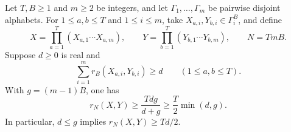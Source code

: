 \begin{lemma}\label{lem:tagged}
Let $T,B\geq1$ and $m\geq2$ be integers, and let
$\Gamma_1,\ldots,\Gamma_m$ be pairwise disjoint alphabets. For
$1\leq a,b\leq T$ and $1\leq i\leq m$, take
$X_{a,i},Y_{b,i}\in\Gamma_i^B$, and define
\[
 X=\prod_{a=1}^T(X_{a,1}\cdots X_{a,m}),\qquad
 Y=\prod_{b=1}^T(Y_{b,1}\cdots Y_{b,m}),\qquad N=TmB.
\]
Suppose $d\geq0$ is real and
\begin{equation}\label{eq:local-tagged}
 \sum_{i=1}^m r_B(X_{a,i},Y_{b,i})\geq d
 \qquad(1\leq a,b\leq T).
\end{equation}
With $g=(m-1)B$, one has
\begin{equation}\label{eq:tagged-result}
 r_N(X,Y)\geq\frac{Tdg}{d+g}
 \geq\frac T2\min(d,g).
\end{equation}
In particular, $d\leq g$ implies $r_N(X,Y)\geq Td/2$.
\end{lemma}

